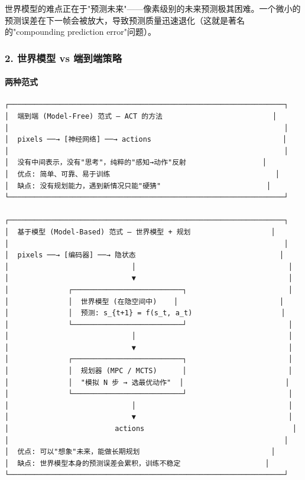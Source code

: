 \documentclass[UTF8,a4paper,11pt]{ctexart}
\begin{document}
世界模型的难点正在于"预测未来"——像素级别的未来预测极其困难。一个微小的预测误差在下一帧会被放大，导致预测质量迅速退化（这就是著名的"compounding prediction error"问题）。

\subsubsection{2. 世界模型 vs 端到端策略}

\paragraph{两种范式}


\begin{lstlisting}[language=text]
┌─────────────────────────────────────────────────────────────────┐
│  端到端 (Model-Free) 范式 — ACT 的方法                          │
│                                                                 │
│  pixels ──→ [神经网络] ──→ actions                               │
│                                                                 │
│  没有中间表示，没有"思考"，纯粹的"感知→动作"反射                  │
│  优点: 简单、可靠、易于训练                                       │
│  缺点: 没有规划能力，遇到新情况只能"硬猜"                         │
└─────────────────────────────────────────────────────────────────┘

┌─────────────────────────────────────────────────────────────────┐
│  基于模型 (Model-Based) 范式 — 世界模型 + 规划                   │
│                                                                 │
│  pixels ──→ [编码器] ──→ 隐状态                                  │
│                             │                                    │
│                             ▼                                    │
│              ┌──────────────────────────┐                        │
│              │  世界模型 (在隐空间中)    │                        │
│              │  预测: s_{t+1} = f(s_t, a_t)                     │
│              └──────────────────────────┘                        │
│                             │                                    │
│                             ▼                                    │
│              ┌──────────────────────────┐                        │
│              │  规划器 (MPC / MCTS)      │                        │
│              │  "模拟 N 步 → 选最优动作"  │                        │
│              └──────────────────────────┘                        │
│                             │                                    │
│                             ▼                                    │
│                         actions                                   │
│                                                                 │
│  优点: 可以"想象"未来，能做长期规划                               │
│  缺点: 世界模型本身的预测误差会累积，训练不稳定                    │
└─────────────────────────────────────────────────────────────────┘
\end{lstlisting}
\end{document}
